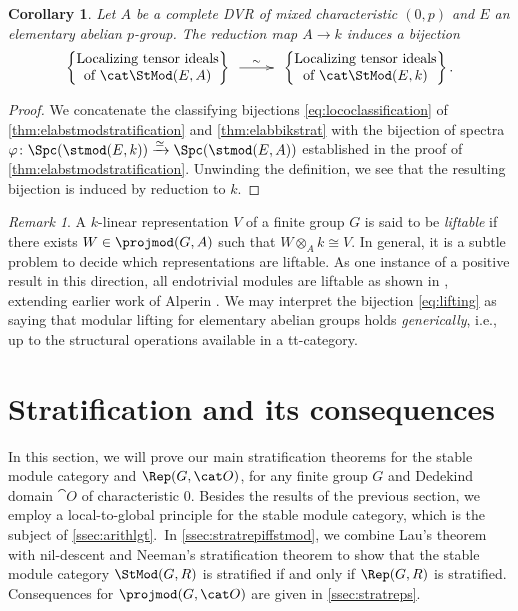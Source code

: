 \documentclass{amsart}%
\numberwithin{equation}{section}%
\newtheorem{Cor}[equation]{Corollary}
\theoremstyle{remark}
\newtheorem{Rem}[equation]{Remark}
\begin{document}
\begin{Cor}\label{cor:elabgenericlifting}
Let $A$ be a complete DVR of mixed characteristic $(0,p)$ and $E$ an elementary abelian $p$-group. The reduction map $A \to k$ induces a bijection
\begin{equation}\label{eq:lifting}
\begin{Bmatrix}
\text{Localizing tensor ideals} \\
\text{of } \cat \StMod(E,A)
\end{Bmatrix} 
\xymatrix@C=2pc{ \ar[r]^-{\sim} &}
\begin{Bmatrix}
\text{Localizing tensor ideals} \\
\text{of } \cat \StMod(E,k)
\end{Bmatrix}.
\end{equation}
\end{Cor}
\begin{proof}
We concatenate the classifying bijections \eqref{eq:lococlassification} of \cref{thm:elabstmodstratification} and \cref{thm:elabbikstrat} with the bijection of spectra $\varphi\colon\Spc(\stmod(E,k)) \xrightarrow{\simeq} \Spc(\stmod(E,A))$ established in the proof of \cref{thm:elabstmodstratification}. Unwinding the definition, we see that the resulting bijection is induced by reduction to $k$.
\end{proof}

\begin{Rem}
A $k$-linear representation $V$ of a finite group $G$ is said to be \emph{liftable} if there exists $W \in \projmod(G,A)$ such that $W\otimes_Ak \cong V$. In general, it is a subtle problem to decide which representations are liftable. As one instance of a positive result in this direction, all endotrivial modules are liftable as shown in \cite{lms_lifting}, extending earlier work of Alperin \cite{alperin_lifting}. We may interpret the bijection \eqref{eq:lifting} as saying that modular lifting for elementary abelian groups holds \emph{generically}, i.e., up to the structural operations available in a tt-category. 
\end{Rem}



\section{Stratification and its consequences}

In this section, we will prove our main stratification theorems for the stable module category and $\Rep(G,\cat O)$, for any finite group $G$ and Dedekind domain $\cat O$ of characteristic $0$. Besides the results of the previous section, we employ a local-to-global principle for the stable module category, which is the subject of \cref{ssec:arithlgt}.~In \cref{ssec:stratrepiffstmod}, we combine Lau's theorem with nil-descent and Neeman's stratification theorem to show that the stable module category $\StMod(G,R)$ is stratified if and only if $\Rep(G,R)$ is stratified. Consequences for $\projmod(G,\cat O)$ are given in \cref{ssec:stratreps}.
\end{document}
